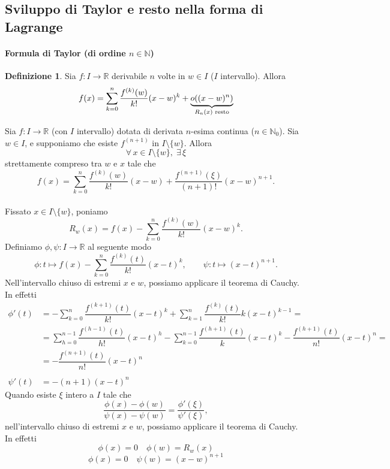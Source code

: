\documentclass{article}
\theoremstyle{plain}
\theoremstyle{definition}
\newtheorem{defn}{Definizione}[section]
\theoremstyle{remark}
\begin{document}
\vspace{10pt}

\subsection{Sviluppo di Taylor e resto nella forma di Lagrange}

\vspace{10pt}

\paragraph{Formula di Taylor (di ordine $n\in\mathbb{N}$)}
\begin{bxthm}
\begin{defn}
    Sia $f:I\to\mathbb{R}$ derivabile $n$ volte in $w\in I$ ($I$ intervallo). Allora
    \[f(x)=\sum_{k=0}^{n}\dfrac{f^{(k)}(w)}{k!}(x-w)^k+\underbrace{o((x-w)^n)}_{R_n(x)\textup{ resto}}\]
\end{defn}
\end{bxthm}

\vspace{10pt}

Sia $f:I\to\mathbb{R}$ (con $I$ intervallo) dotata di derivata $n$-esima continua ($n\in\mathbb{N}_0$).
Sia $w\in I$, e supponiamo che esiste $f^{(n+1)}$ in $I\setminus\{w\}$. 
Allora \[\forall\,x\in I\setminus\{w\},\;\exists\,\xi\] strettamente compreso tra $w$ e $x$ tale che 
\[f(x)=\sum_{k=0}^{n}\dfrac{f^{(k)}(w)}{k!}(x-w)+\dfrac{f^{(n+1)}(\xi)}{(n+1)!}(x-w)^{n+1}.\]\\
Fissato $x\in I\setminus\{w\}$, poniamo \[R_w(x)=f(x)-\sum_{k=0}^{n}\dfrac{f^{(k)}(w)}{k!}(x-w)^k.\]
Definiamo $\phi,\psi:I\to\mathbb{R}$ al seguente modo 
\[ \phi:t\mapsto f(x)-\sum_{k=0}^{n}\dfrac{f^{(k)}(t)}{k!}(x-t)^k,\quad\quad\psi:t\mapsto(x-t)^{n+1}. \]
Nell'intervallo chiuso di estremi $x$ e $w$, possiamo applicare il teorema di Cauchy. 
In effetti
\begin{align*}
    \phi'(t)&=-\sum_{k=0}^{n}\dfrac{f^{(k+1)}(t)}{k!}(x-t)^k+\sum_{k=1}^{n}\dfrac{f^{(k)}(t)}{k!} k (x-t)^{k-1}=\\
    &=\sum_{h=0}^{n-1}\dfrac{f^{(h-1)}(t)}{h!}(x-t)^h-\sum_{k=0}^{n-1}\dfrac{f^{(h+1)}(t)}{k}(x-t)^k-\dfrac{f^{(h+1)}(t)}{n!}(x-t)^n=\\
    &=-\dfrac{f^{(n+1)}(t)}{n!}(x-t)^n\\\\
    \psi'(t)&=-(n+1)(x-t)^n
\end{align*}
Quando esiste $\xi$ intero a $I$ tale che 
\[\dfrac{\phi(x)-\phi(w)}{\psi(x)-\psi(w)}=\dfrac{\phi'(\xi)}{\psi'(\xi)},\]
nell'intervallo chiuso di estremi $x$ e $w$, possiamo applicare il teorema di Cauchy. 
In effetti 
\[\phi(x)=0\quad \phi(w)=R_w(x)\]
\[\phi(x)=0\quad \psi(w)=(x-w)^{n+1}\]
\end{document}
